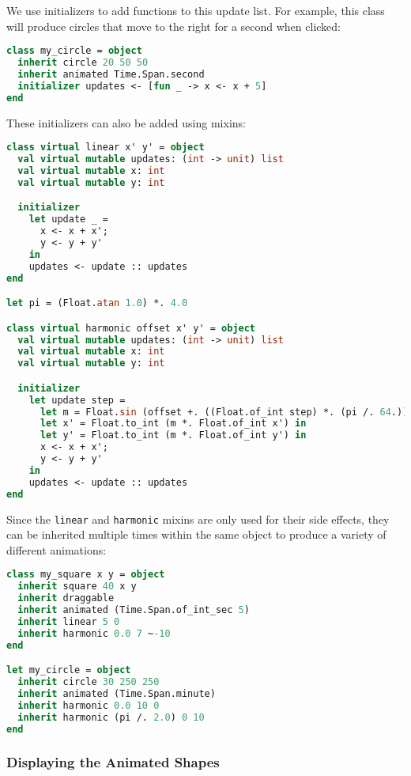 We use initializers to add functions to this update list. For example,
this class will produce circles that move to the right for a second when
clicked:

\begin{lstlisting}[language=Caml]
class my_circle = object
  inherit circle 20 50 50
  inherit animated Time.Span.second
  initializer updates <- [fun _ -> x <- x + 5]
end
\end{lstlisting}

These initializers can also be added using mixins:

\begin{lstlisting}[language=Caml]
class virtual linear x' y' = object
  val virtual mutable updates: (int -> unit) list
  val virtual mutable x: int
  val virtual mutable y: int

  initializer
    let update _ =
      x <- x + x';
      y <- y + y'
    in
    updates <- update :: updates
end

let pi = (Float.atan 1.0) *. 4.0

class virtual harmonic offset x' y' = object
  val virtual mutable updates: (int -> unit) list
  val virtual mutable x: int
  val virtual mutable y: int

  initializer
    let update step =
      let m = Float.sin (offset +. ((Float.of_int step) *. (pi /. 64.))) in
      let x' = Float.to_int (m *. Float.of_int x') in
      let y' = Float.to_int (m *. Float.of_int y') in
      x <- x + x';
      y <- y + y'
    in
    updates <- update :: updates
end
\end{lstlisting}

Since the \passthrough{\lstinline!linear!} and
\passthrough{\lstinline!harmonic!} mixins are only used for their side
effects, they can be inherited multiple times within the same object to
produce a variety of different animations: 

\begin{lstlisting}[language=Caml]
class my_square x y = object
  inherit square 40 x y
  inherit draggable
  inherit animated (Time.Span.of_int_sec 5)
  inherit linear 5 0
  inherit harmonic 0.0 7 ~-10
end

let my_circle = object
  inherit circle 30 250 250
  inherit animated (Time.Span.minute)
  inherit harmonic 0.0 10 0
  inherit harmonic (pi /. 2.0) 0 10
end
\end{lstlisting}

\hypertarget{displaying-the-animated-shapes}{%
\subsubsection{Displaying the Animated
Shapes}\label{displaying-the-animated-shapes}}

